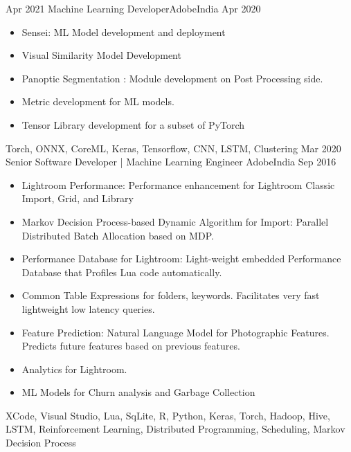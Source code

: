 \begin{experiences}
  \experience
    {Apr 2021}   {Machine Learning Developer}{Adobe}{India}
    {Apr 2020} {
                      \begin{itemize}
                        \item Sensei: ML Model development and deployment
                        \item Visual Similarity Model Development 
                        \item Panoptic Segmentation : Module development on Post Processing side.
                        \item Metric development for ML models.
                        \item Tensor Library development for a subset of PyTorch
                      \end{itemize}
                    }
                    {Torch, ONNX, CoreML, Keras, Tensorflow, CNN, LSTM, Clustering}
  \emptySeparator
  \experience 
  {Mar 2020}
  {Senior Software Developer | Machine Learning Engineer}
  {Adobe}{India}
  {Sep 2016}
  {
  	\begin{itemize}
  	
  	\item Lightroom Performance: Performance enhancement for Lightroom Classic Import, Grid, and Library
  	
  	\item Markov Decision Process-based Dynamic Algorithm for Import: Parallel Distributed Batch Allocation based on MDP.                     
  	
  	\item Performance Database for Lightroom: Light-weight embedded Performance Database that Profiles Lua code automatically.
  	
  	\item Common Table Expressions for folders, keywords. Facilitates very fast lightweight low latency queries.                
  	
  	\item Feature Prediction: Natural Language Model for Photographic Features. Predicts future features based on previous features.
  	
  	\item Analytics for Lightroom.
  	
  	\item ML Models for Churn analysis and Garbage Collection
  \end{itemize}
	}
  {XCode, Visual Studio, Lua, SqLite, R, Python, Keras, Torch, Hadoop, Hive, LSTM, Reinforcement Learning, Distributed Programming, Scheduling, Markov Decision Process}
  \emptySeparator
  

\end{experiences}
